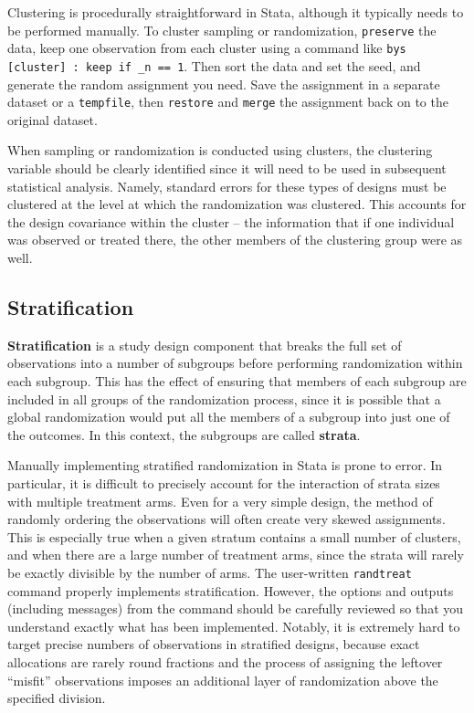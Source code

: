 Clustering is procedurally straightforward in Stata,
although it typically needs to be performed manually.
To cluster sampling or randomization,
\texttt{preserve} the data, keep one observation from each cluster
using a command like \texttt{bys [cluster] : keep if \_n == 1}.
Then sort the data and set the seed, and generate the random assignment you need.
Save the assignment in a separate dataset or a \texttt{tempfile},
then \texttt{restore} and \texttt{merge} the assignment back on to the original dataset.

When sampling or randomization is conducted using clusters,
the clustering variable should be clearly identified
since it will need to be used in subsequent statistical analysis.
Namely, standard errors for these types of designs must be clustered
at the level at which the randomization was clustered.
This accounts for the design covariance within the cluster --
the information that if one individual was observed or treated there,
the other members of the clustering group were as well.

\subsection{Stratification}

\textbf{Stratification} is a study design component
that breaks the full set of observations into a number of subgroups
before performing randomization within each subgroup.
This has the effect of ensuring that members of each subgroup
are included in all groups of the randomization process,
since it is possible that a global randomization
would put all the members of a subgroup into just one of the outcomes.
In this context, the subgroups are called \textbf{strata}.

Manually implementing stratified randomization in Stata is prone to error.
In particular, it is difficult to precisely account
for the interaction of strata sizes with multiple treatment arms.
Even for a very simple design, the method of randomly ordering the observations
will often create very skewed assignments.
This is especially true when a given stratum contains a small number of clusters,
and when there are a large number of treatment arms,
since the strata will rarely be exactly divisible by the number of arms.\cite{carril2017dealing}
The user-written \texttt{randtreat} command properly implements stratification.
However, the options and outputs (including messages) from the command should be carefully reviewed
so that you understand exactly what has been implemented.
Notably, it is extremely hard to target precise numbers of observations
in stratified designs, because exact allocations are rarely round fractions
and the process of assigning the leftover ``misfit'' observations
imposes an additional layer of randomization above the specified division.

